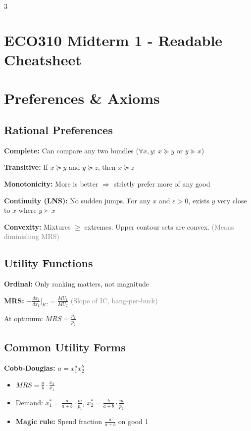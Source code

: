 \documentclass[10pt,landscape]{article}
\newcommand{\formula}[2]{\textbf{#1:} $#2$}
\newcommand{\note}[1]{\textcolor{gray}{\small(#1)}}
\begin{document}
\begin{multicols}{3}
\small

\section*{ECO310 Midterm 1 - Readable Cheatsheet}

\section{Preferences \& Axioms}

\subsection{Rational Preferences}
\textbf{Complete:} Can compare any two bundles ($\forall x,y$: $x \succeq y$ or $y \succeq x$)

\textbf{Transitive:} If $x \succeq y$ and $y \succeq z$, then $x \succeq z$

\textbf{Monotonicity:} More is better $\Rightarrow$ strictly prefer more of any good

\textbf{Continuity (LNS):} No sudden jumps. For any $x$ and $\varepsilon > 0$, exists $y$ very close to $x$ where $y \succ x$

\textbf{Convexity:} Mixtures $\geq$ extremes. Upper contour sets are convex.
\note{Means diminishing MRS}

\subsection{Utility Functions}
\textbf{Ordinal:} Only ranking matters, not magnitude

\formula{MRS}{-\frac{dx_2}{dx_1}\Big|_{IC} = \frac{MU_1}{MU_2}}
\note{Slope of IC, bang-per-buck}

At optimum: $MRS = \frac{p_1}{p_2}$

\subsection{Common Utility Forms}

\textbf{Cobb-Douglas:} $u = x_1^a x_2^b$
\begin{itemize}[leftmargin=*,noitemsep]
\item $MRS = \frac{a}{b} \cdot \frac{x_2}{x_1}$
\item Demand: $x_1^* = \frac{a}{a+b} \cdot \frac{m}{p_1}$, $x_2^* = \frac{b}{a+b} \cdot \frac{m}{p_2}$
\item \textbf{Magic rule:} Spend fraction $\frac{a}{a+b}$ on good 1
\end{itemize}


\end{multicols}
\end{document}
